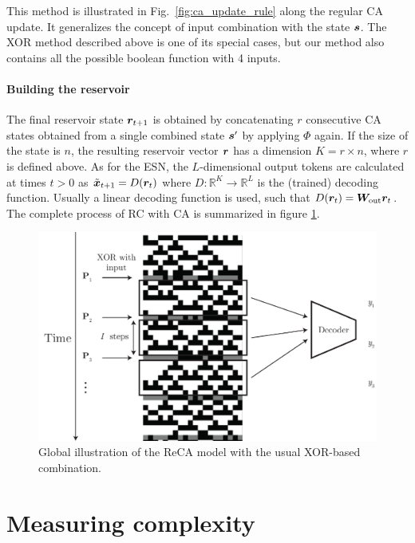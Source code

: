 This method is illustrated in Fig.~\ref{fig:ca_update_rule} along the regular CA
update. It generalizes the concept of input combination with the state ${\bm{s}}$.
The XOR method described above is one of its special cases, but our method also
contains all the possible boolean function with 4 inputs.

\paragraph{Building the reservoir}
The final reservoir state ${\bm{r}}_{t + 1}$ is obtained by concatenating $r$
consecutive CA states obtained from a single combined state ${\bm{s}}'$ by applying
$\Phi$ again. If the size of the state is $n$, the resulting reservoir vector
${\bm{r}}$ has a dimension $K = r \times n$, where $r$ is defined above. As for the
\ac{ESN}, the $L$-dimensional output tokens are calculated at times $t > 0$ as
$\tilde{{\bm{x}}}_{t+ 1} = D({\bm{r}}_{t})$ where
$D: \mathbb{R}^{K} \rightarrow \mathbb{R}^{L}$ is the (trained) decoding
function. Usually a linear decoding function is used, such that
$D({\bm{r}}_{t}) = {\bm{W}}_{\text{out}}{\bm{r}}_{t}$. The complete process of \ac{RC} with
\ac{CA} is summarized in figure \ref{fig:reca-schema}.

\begin{figure}[htbp]
  \centering
  \includegraphics[width=.6\linewidth]{figures/reca_schema.pdf}
  \caption{Global illustration of the ReCA model with the usual XOR-based
    combination.}\label{fig:reca-schema}
\end{figure}

\section{Measuring complexity}

